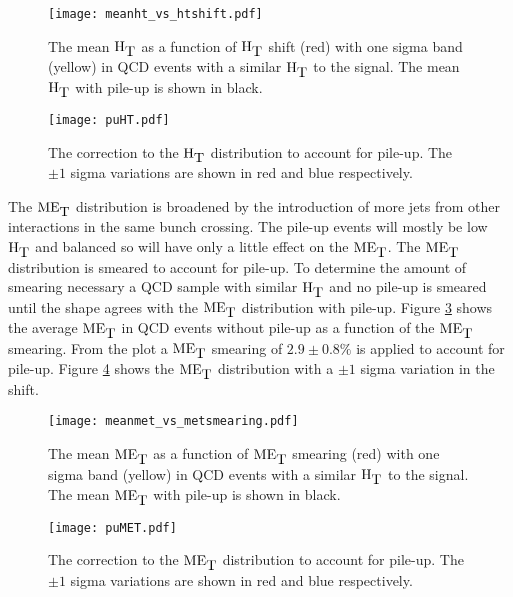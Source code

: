 \begin{figure}
\begin{center}
\texttt{[image: meanht\_vs\_htshift.pdf]}
\end{center}
\caption{The mean $\mbox{H}_{\mbox{T}}$ as a function of $\mbox{H}_{\mbox{T}}$ shift (red) with one sigma band 
(yellow) in QCD events with a similar $\mbox{H}_{\mbox{T}}$ to the signal. The mean $\mbox{H}_{\mbox{T}}$ with 
pile-up is shown in black.}
\label{fig:meanht_vs_htshift}
\end{figure}

\begin{figure}
\begin{center}
\texttt{[image: puHT.pdf]}
\end{center}
\caption{The correction to the $\mbox{H}_{\mbox{T}}$ distribution to account for pile-up. The
$\pm 1$ sigma variations are shown in red and blue respectively.}
\label{fig:puHT}
\end{figure}

The $\mbox{ME}_{\mbox{T}}$ distribution is broadened by the introduction of more jets from other
interactions in the same bunch crossing. The pile-up events will mostly be low
$\mbox{H}_{\mbox{T}}$ and balanced so will have only a little effect on the $\mbox{ME}_{\mbox{T}}$. The $\mbox{ME}_{\mbox{T}}$
distribution is smeared to account for pile-up. To determine the amount of
smearing necessary a QCD sample with similar $\mbox{H}_{\mbox{T}}$ and no pile-up is smeared
until the shape agrees with the $\mbox{ME}_{\mbox{T}}$ distribution with pile-up. Figure 
\ref{fig:meanmet_vs_metsmearing} shows the average $\mbox{ME}_{\mbox{T}}$ in QCD events without 
pile-up as a function of the $\mbox{ME}_{\mbox{T}}$ smearing. From the plot a $\mbox{ME}_{\mbox{T}}$ smearing of 
$2.9\pm0.8\%$ is applied to account for pile-up. Figure \ref{fig:puMET} shows the 
$\mbox{ME}_{\mbox{T}}$ distribution with a $\pm 1$ sigma variation in the shift. \\

\begin{figure}
\begin{center}
\texttt{[image: meanmet\_vs\_metsmearing.pdf]}
\end{center}
\caption{The mean $\mbox{ME}_{\mbox{T}}$ as a function of $\mbox{ME}_{\mbox{T}}$ smearing (red) with one sigma
band (yellow) in QCD events with a similar $\mbox{H}_{\mbox{T}}$ to the signal. The mean $\mbox{ME}_{\mbox{T}}$ 
with pile-up is shown in black.}
\label{fig:meanmet_vs_metsmearing}
\end{figure}

\begin{figure}
\begin{center}
\texttt{[image: puMET.pdf]}
\end{center}
\caption{The correction to the $\mbox{ME}_{\mbox{T}}$ distribution to account for pile-up. The
$\pm 1$ sigma variations are shown in red and blue respectively.}
\label{fig:puMET}
\end{figure}

